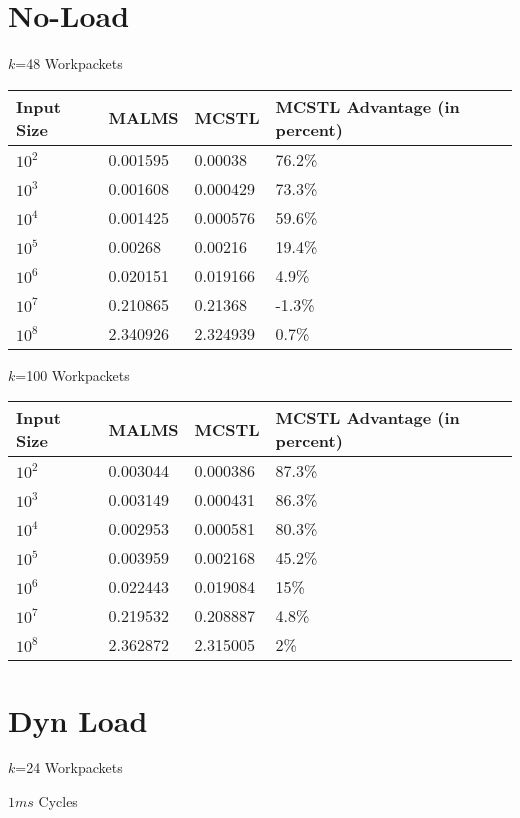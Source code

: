 \documentclass{article}
\begin{document}
\section{No-Load}

$k$=48 Workpackets


\begin{tabular}{l|l|l|l}
Input Size	& MALMS		& MCSTL		& MCSTL Advantage (in percent)	\\
\hline
$10^2$		& 0.001595	& 0.00038	& 76.2\% \\
$10^3$		& 0.001608	& 0.000429	& 73.3\% \\
$10^4$		& 0.001425	& 0.000576	& 59.6\% \\
$10^5$		& 0.00268	& 0.00216	& 19.4\% \\
$10^6$		& 0.020151	& 0.019166	& 4.9\% \\
$10^7$		& 0.210865	& 0.21368	& -1.3\% \\
$10^8$		& 2.340926	& 2.324939	& 0.7\% \\
\end{tabular}



$k$=100 Workpackets

\begin{tabular}{l|l|l|l}
Input Size	& MALMS		& MCSTL		& MCSTL Advantage (in percent)	\\
\hline
$10^2$		& 0.003044	& 0.000386	& 87.3\% \\
$10^3$		& 0.003149	& 0.000431	& 86.3\% \\
$10^4$		& 0.002953	& 0.000581	& 80.3\% \\
$10^5$		& 0.003959	& 0.002168	& 45.2\% \\
$10^6$		& 0.022443	& 0.019084	& 15\% \\
$10^7$		& 0.219532	& 0.208887	& 4.8\% \\
$10^8$		& 2.362872	& 2.315005	& 2\% \\
\end{tabular}


\section{Dyn Load}
$k$=24 Workpackets

$1ms$ Cycles
\end{document}
